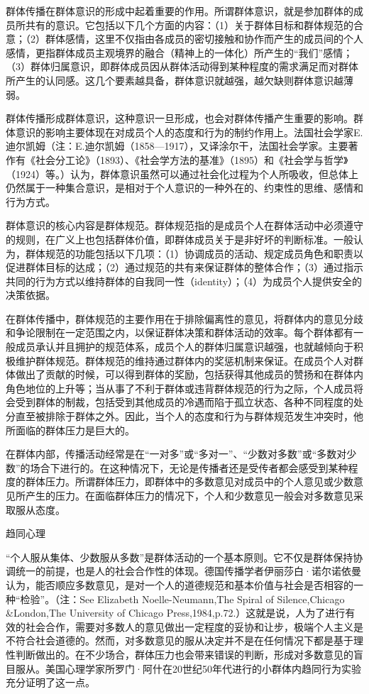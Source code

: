 \documentclass[UTF8,12pt]{ctexart}
\numberwithin{equation}{section} %
\numberwithin{figure}{section}
\numberwithin{table}{section}
\begin{document}
	群体传播在群体意识的形成中起着重要的作用。所谓群体意识，就是参加群体的成员所共有的意识。它包括以下几个方面的内容：（1）关于群体目标和群体规范的合意；（2）群体感情，这里不仅指由各成员的密切接触和协作而产生的成员间的个人感情，更指群体成员主观境界的融合（精神上的一体化）所产生的“我们”感情；（3）群体归属意识，即群体成员因从群体活动得到某种程度的需求满足而对群体所产生的认同感。这几个要素越具备，群体意识就越强，越欠缺则群体意识越薄弱。
	
	群体传播形成群体意识，这种意识一旦形成，也会对群体传播产生重要的影响。群体意识的影响主要体现在对成员个人的态度和行为的制约作用上。法国社会学家E.迪尔凯姆（注：E.迪尔凯姆（1858—1917），又译涂尔干，法国社会学家。主要著作有《社会分工论》（1893）、《社会学方法的基准》（1895）和《社会学与哲学》（1924）等。）认为，群体意识虽然可以通过社会化过程为个人所吸收，但总体上仍然属于一种集合意识，是相对于个人意识的一种外在的、约束性的思维、感情和行为方式。
	
	群体意识的核心内容是群体规范。群体规范指的是成员个人在群体活动中必须遵守的规则，在广义上也包括群体价值，即群体成员关于是非好坏的判断标准。一般认为，群体规范的功能包括以下几项：（1）协调成员的活动、规定成员角色和职责以促进群体目标的达成；（2）通过规范的共有来保证群体的整体合作；（3）通过指示共同的行为方式以维持群体的自我同一性（identity）；（4）为成员个人提供安全的决策依据。
	
	在群体传播中，群体规范的主要作用在于排除偏离性的意见，将群体内的意见分歧和争论限制在一定范围之内，以保证群体决策和群体活动的效率。每个群体都有一般成员承认并且拥护的规范体系，成员个人的群体归属意识越强，也就越倾向于积极维护群体规范。群体规范的维持通过群体内的奖惩机制来保证。在成员个人对群体做出了贡献的时候，可以得到群体的奖励，包括获得其他成员的赞扬和在群体内角色地位的上升等；当从事了不利于群体或违背群体规范的行为之际，个人成员将会受到群体的制裁，包括受到其他成员的冷遇而陷于孤立状态、各种不同程度的处分直至被排除于群体之外。因此，当个人的态度和行为与群体规范发生冲突时，他所面临的群体压力是巨大的。
	
	在群体内部，传播活动经常是在“一对多”或“多对一”、“少数对多数”或“多数对少数”的场合下进行的。在这种情况下，无论是传播者还是受传者都会感受到某种程度的群体压力。所谓群体压力，即群体中的多数意见对成员中的个人意见或少数意见所产生的压力。在面临群体压力的情况下，个人和少数意见一般会对多数意见采取服从态度。
	
	趋同心理
	
	“个人服从集体、少数服从多数”是群体活动的一个基本原则。它不仅是群体保持协调统一的前提，也是人的社会合作性的体现。德国传播学者伊丽莎白·诺尔诺依曼认为，能否顺应多数意见，是对一个人的道德规范和基本价值与社会是否相容的一种“检验”。（注：See Elizabeth Noelle-Neumann,The Spiral of Silence,Chicago \&London,The University of Chicago Press,1984,p.72.）这就是说，人为了进行有效的社会合作，需要对多数人的意见做出一定程度的妥协和让步，极端个人主义是不符合社会道德的。然而，对多数意见的服从决定并不是在任何情况下都是基于理性判断做出的。在不少场合，群体压力也会带来错误的判断，形成对多数意见的盲目服从。美国心理学家所罗门·阿什在20世纪50年代进行的小群体内趋同行为实验充分证明了这一点。
	
\end{document}
